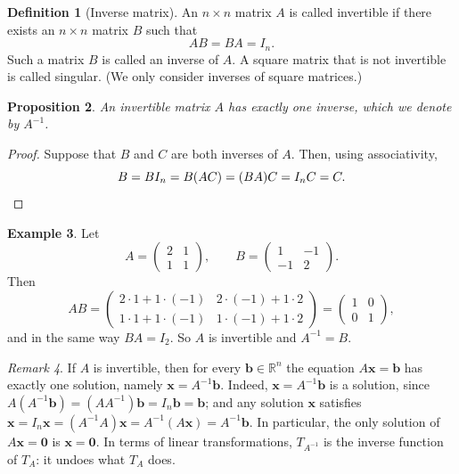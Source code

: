 \documentclass[11pt]{article}
\theoremstyle{definition}
\newtheorem{definition}{Definition}[section]
\newtheorem{example}[definition]{Example}
\theoremstyle{plain}
\newtheorem{proposition}[definition]{Proposition}
\theoremstyle{remark}
\newtheorem{remark}[definition]{Remark}
\begin{document}
\begin{definition}[Inverse matrix]
    An $n \times n$ matrix $A$ is called invertible if there exists an $n \times n$ matrix $B$ such that
    \[AB = BA = I_n.\]
    Such a matrix $B$ is called an inverse of $A$. A square matrix that is not invertible is called singular. (We only consider inverses of square matrices.)
\end{definition}

\begin{proposition}
    An invertible matrix $A$ has exactly one inverse, which we denote by $A^{-1}$.
\end{proposition}

\begin{proof}
    Suppose that $B$ and $C$ are both inverses of $A$. Then, using associativity,
    \[B = B I_n = B(AC) = (BA)C = I_n C = C. \qedhere\]
\end{proof}

\begin{example}
    Let
    \[A = \begin{pmatrix}
        2 & 1 \\
        1 & 1
    \end{pmatrix}, \qquad B = \begin{pmatrix}
        1 & -1 \\
        -1 & 2
    \end{pmatrix}.\]
    Then
    \[AB = \begin{pmatrix}
        2 \cdot 1 + 1 \cdot (-1) & 2 \cdot (-1) + 1 \cdot 2 \\
        1 \cdot 1 + 1 \cdot (-1) & 1 \cdot (-1) + 1 \cdot 2
    \end{pmatrix} = \begin{pmatrix}
        1 & 0 \\
        0 & 1
    \end{pmatrix},\]
    and in the same way $BA = I_2$. So $A$ is invertible and $A^{-1} = B$.
\end{example}

\begin{remark}\label{rem:inverse-solve}
    If $A$ is invertible, then for every $\mathbf{b} \in \mathbb{R}^n$ the equation $A\mathbf{x} = \mathbf{b}$ has exactly one solution, namely $\mathbf{x} = A^{-1}\mathbf{b}$. Indeed, $\mathbf{x} = A^{-1}\mathbf{b}$ is a solution, since $A(A^{-1}\mathbf{b}) = (AA^{-1})\mathbf{b} = I_n \mathbf{b} = \mathbf{b}$; and any solution $\mathbf{x}$ satisfies $\mathbf{x} = I_n \mathbf{x} = (A^{-1}A)\mathbf{x} = A^{-1}(A\mathbf{x}) = A^{-1}\mathbf{b}$. In particular, the only solution of $A\mathbf{x} = \mathbf{0}$ is $\mathbf{x} = \mathbf{0}$. In terms of linear transformations, $T_{A^{-1}}$ is the inverse function of $T_A$: it undoes what $T_A$ does.
\end{remark}
\end{document}
